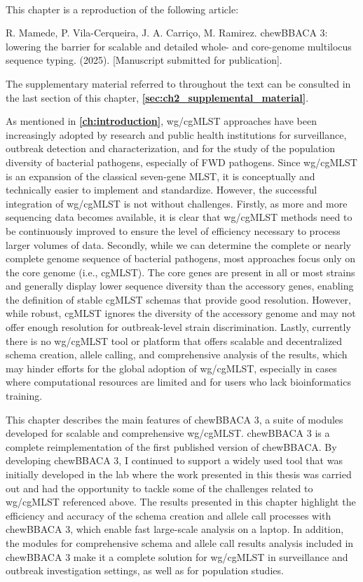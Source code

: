 \mbox{}\\
\vspace{8cm}

This chapter is a reproduction of the following article:

R. Mamede, P. Vila-Cerqueira, J. A. Carriço, M. Ramirez. chewBBACA 3: lowering the barrier for scalable and detailed whole- and core-genome multilocus sequence typing. (2025). [Manuscript submitted for publication].

The supplementary material referred to throughout the text can be consulted in the last section of this chapter, \textbf{\autoref{sec:ch2_supplemental_material}}.

As mentioned in \textbf{\autoref{ch:introduction}}, \ac{wg/cgMLST} approaches have been increasingly adopted by research and public health institutions for surveillance, outbreak detection and characterization, and for the study of the population diversity of bacterial pathogens, especially of \ac{FWD} pathogens. Since \ac{wg/cgMLST} is an expansion of the classical seven-gene \ac{MLST}, it is conceptually and technically easier to implement and standardize. However, the successful integration of \ac{wg/cgMLST} is not without challenges. Firstly, as more and more sequencing data becomes available, it is clear that \ac{wg/cgMLST} methods need to be continuously improved to ensure the level of efficiency necessary to process larger volumes of data. Secondly, while we can determine the complete or nearly complete genome sequence of bacterial pathogens, most approaches focus only on the core genome (i.e., \ac{cgMLST}). The core genes are present in all or most strains and generally display lower sequence diversity than the accessory genes, enabling the definition of stable \ac{cgMLST} schemas that provide good resolution. However, while robust, \ac{cgMLST} ignores the diversity of the accessory genome and may not offer enough resolution for outbreak-level strain discrimination. Lastly, currently there is no \ac{wg/cgMLST} tool or platform that offers scalable and decentralized schema creation, allele calling, and comprehensive analysis of the results, which may hinder efforts for the global adoption of \ac{wg/cgMLST}, especially in cases where computational resources are limited and for users who lack bioinformatics training.

This chapter describes the main features of chewBBACA 3, a suite of modules developed for scalable and comprehensive \ac{wg/cgMLST}. chewBBACA 3 is a complete reimplementation of the first published version of chewBBACA. By developing chewBBACA 3, I continued to support a widely used tool that was initially developed in the lab where the work presented in this thesis was carried out and had the opportunity to tackle some of the challenges related to \ac{wg/cgMLST} referenced above. The results presented in this chapter highlight the efficiency and accuracy of the schema creation and allele call processes with chewBBACA 3, which enable fast large-scale analysis on a laptop. In addition, the modules for comprehensive schema and allele call results analysis included in chewBBACA 3 make it a complete solution for \ac{wg/cgMLST} in surveillance and outbreak investigation settings, as well as for population studies.

